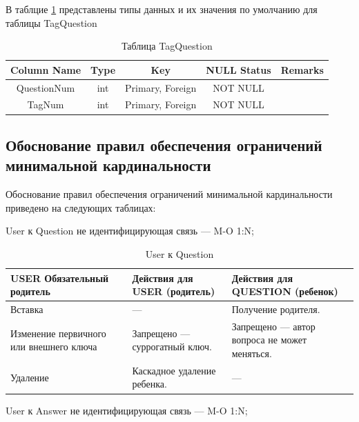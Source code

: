 \documentclass[a4paper, 14pt]{extarticle}
\begin{document}
\newpage

В таблцие \ref{tab:tag_question_tab} представлены типы данных и их значения по умолчанию для таблицы TagQuestion

\begin{table}[H]
\centering
\caption{Таблица TagQuestion}
\label{tab:tag_question_tab}
\setlength\extrarowheight{2pt}
\begin{tabular}{|c|c|c|c|c|}
\hline
\textbf{Column Name} & \textbf{Type} & \textbf{Key} & \textbf{NULL Status} & \textbf{Remarks} \\
\hline
QuestionNum & int & Primary, Foreign & NOT NULL & \\
\hline
TagNum & int & Primary, Foreign & NOT NULL & \\
\hline
\end{tabular}
\end{table}



\pagebreak

\subsection{Обоснование правил обеспечения ограничений минимальной кардинальности}

Обоснование правил обеспечения ограничений минимальной кардинальности приведено на следующих таблицах:


User к Question не идентифицирующая связь — M-O 1:N;


\begin{table}[H]
\centering
\caption{User к Question}
\begin{tabular}{|>{\centering\arraybackslash}m{4cm}|>{\RaggedRight}m{6cm}|>{\RaggedRight}m{6cm}|}
\hline
\textbf{USER Обязательный родитель} & \textbf{Действия для USER (родитель)} & \textbf{Действия для QUESTION (ребенок)} \\
\hline
Вставка & — & Получение родителя. \\
\hline
Изменение первичного или внешнего ключа & Запрещено — суррогатный ключ. & Запрещено — автор вопроса не может меняться. \\
\hline
Удаление & Каскадное удаление ребенка. & — \\
\hline
\end{tabular}
\end{table}

User к Answer не идентифицирующая связь — M-O 1:N;
\end{document}
